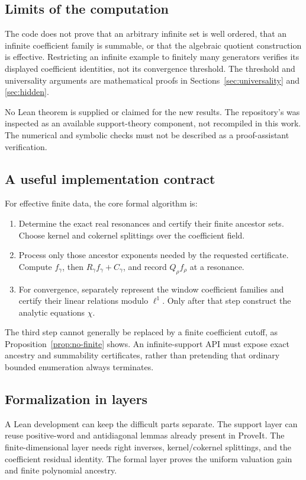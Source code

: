\documentclass[11pt,a4paper]{article}
\numberwithin{equation}{section}
\theoremstyle{definition}
\theoremstyle{remark}
\begin{document}
\subsection{Limits of the computation}
The code does not prove that an arbitrary infinite set is well ordered,
that an infinite coefficient family is summable, or that the algebraic
quotient construction is effective. Restricting an infinite example to
finitely many generators verifies its displayed coefficient identities,
not its convergence threshold. The threshold and universality arguments
are mathematical proofs in Sections~\ref{sec:universality} and
\ref{sec:hidden}.

No Lean theorem is supplied or claimed for the new results. The repository's
 was inspected as an available support-theory
component, not recompiled in this work. The numerical and symbolic checks
must not be described as a proof-assistant verification.

\subsection{A useful implementation contract}
For effective finite data, the core formal algorithm is:
\begin{enumerate}
\item Determine the exact real resonances and certify their finite ancestor
sets. Choose kernel and cokernel splittings over the coefficient field.
\item Process only those ancestor exponents needed by the requested
certificate. Compute $f_\gamma$, then $R_\gamma f_\gamma+C_\gamma$, and
record $Q_\rho f_\rho$ at a resonance.
\item For convergence, separately represent the window coefficient
families and certify their linear relations modulo $\ell^1$. Only after
that step construct the analytic equations $\chi$.
\end{enumerate}
The third step cannot generally be replaced by a finite coefficient cutoff,
as Proposition~\ref{prop:no-finite} shows. An infinite-support API must
expose exact ancestry and summability certificates, rather than pretending
that ordinary bounded enumeration always terminates.

\subsection{Formalization in layers}
A Lean development can keep the difficult parts separate. The support layer
can reuse positive-word and antidiagonal lemmas already present in ProveIt.
The finite-dimensional layer needs right inverses, kernel/cokernel
splittings, and the coefficient residual identity. The formal layer proves
the uniform valuation gain and finite polynomial ancestry.
\end{document}
